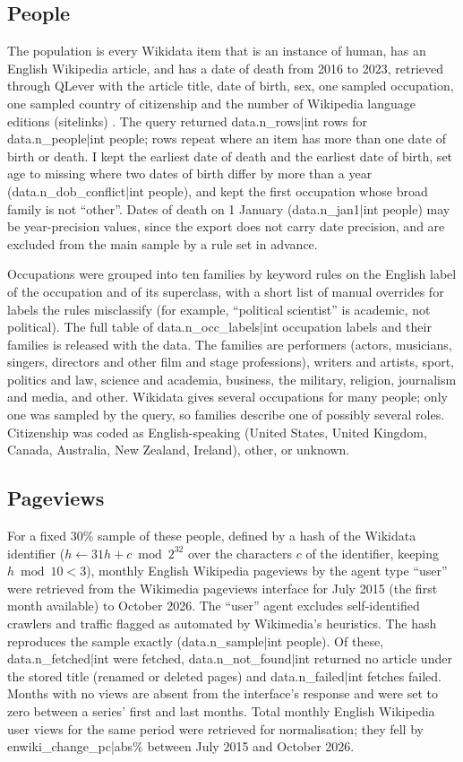 \documentclass[11pt,a4paper]{article}
\begin{document}
\subsection{People}
The population is every Wikidata item that is an instance of human, has an English Wikipedia article, and has a date of death from 2016 to 2023, retrieved through QLever with the article title, date of birth, sex, one sampled occupation, one sampled country of citizenship and the number of Wikipedia language editions (sitelinks) \citep{vrandecic2014}. The query returned {{data.n_rows|int}} rows for {{data.n_people|int}} people; rows repeat where an item has more than one date of birth or death. I kept the earliest date of death and the earliest date of birth, set age to missing where two dates of birth differ by more than a year ({{data.n_dob_conflict|int}} people), and kept the first occupation whose broad family is not ``other''. Dates of death on 1 January ({{data.n_jan1|int}} people) may be year-precision values, since the export does not carry date precision, and are excluded from the main sample by a rule set in advance.

Occupations were grouped into ten families by keyword rules on the English label of the occupation and of its superclass, with a short list of manual overrides for labels the rules misclassify (for example, ``political scientist'' is academic, not political). The full table of {{data.n_occ_labels|int}} occupation labels and their families is released with the data. The families are performers (actors, musicians, singers, directors and other film and stage professions), writers and artists, sport, politics and law, science and academia, business, the military, religion, journalism and media, and other. Wikidata gives several occupations for many people; only one was sampled by the query, so families describe one of possibly several roles. Citizenship was coded as English-speaking (United States, United Kingdom, Canada, Australia, New Zealand, Ireland), other, or unknown.

\subsection{Pageviews}
For a fixed 30\% sample of these people, defined by a hash of the Wikidata identifier ($h \leftarrow 31h + c \bmod 2^{32}$ over the characters $c$ of the identifier, keeping $h \bmod 10 < 3$), monthly English Wikipedia pageviews by the agent type ``user'' were retrieved from the Wikimedia pageviews interface for July 2015 (the first month available) to October 2026. The ``user'' agent excludes self-identified crawlers and traffic flagged as automated by Wikimedia's heuristics. The hash reproduces the sample exactly ({{data.n_sample|int}} people). Of these, {{data.n_fetched|int}} were fetched, {{data.n_not_found|int}} returned no article under the stored title (renamed or deleted pages) and {{data.n_failed|int}} fetches failed. Months with no views are absent from the interface's response and were set to zero between a series' first and last months. Total monthly English Wikipedia user views for the same period were retrieved for normalisation; they fell by {{enwiki_change_pc|abs}}\% between July 2015 and October 2026.
\end{document}
